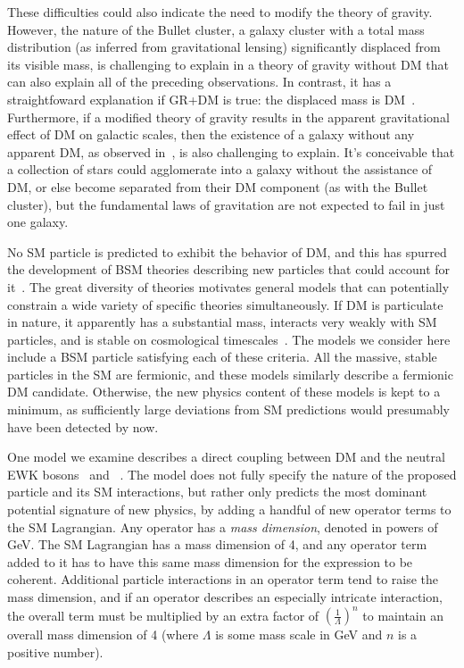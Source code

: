 These difficulties could also indicate the need to modify the theory of gravity.
However, the nature of the Bullet cluster, a galaxy cluster with a total mass distribution (as inferred from gravitational lensing) significantly displaced from its visible mass,
is challenging to explain in a theory of gravity without DM that can also explain all of the preceding observations.
In contrast, it has a straightfoward explanation if GR+DM is true: the displaced mass is DM~\cite{ref:508162}. Furthermore, if a modified theory of gravity
results in the apparent gravitational effect of DM on galactic scales, then the existence of a galaxy without any apparent DM, as observed in~\cite{ref:nature25767}, is
also challenging to explain. It's conceivable that a collection of stars could agglomerate into a galaxy without the assistance of DM, or else become separated from their
DM component (as with the Bullet cluster), but the fundamental laws of gravitation are not expected to fail in just one galaxy.

No SM particle is predicted to exhibit the behavior of DM, and this has spurred the development
of BSM theories describing new particles that could account for it~\cite{ref:s41550-017-0059, ref:j.physrep.2004.08.031, ref:annurev.nucl.54.070103.181244, ref:S1062798717000783}.
The great diversity of theories motivates general models that can potentially constrain a wide variety of specific theories simultaneously.
If DM is particulate in nature, it apparently has a substantial mass, interacts very weakly with SM particles, and is stable on cosmological timescales~\cite{}.
The models we consider here include a BSM particle satisfying each of these criteria.
All the massive, stable particles in the SM are fermionic, and these models similarly describe a fermionic DM candidate. Otherwise, the new physics
content of these models is kept to a minimum, as sufficiently large deviations from SM predictions would presumably have been detected by now.

One model we examine describes a direct coupling between DM and the neutral EWK bosons \PZ\ and \Pgamma~\cite{ref:PhysRevD.89.056011}. The model does not fully specify
the nature of the proposed particle and its SM interactions, but rather only predicts the most dominant potential signature of new physics,
by adding a handful of new operator terms to the SM Lagrangian. Any operator has a \textit{mass dimension}, denoted in powers of GeV. The SM Lagrangian has
a mass dimension of 4, and any operator term added to it has to have this same mass dimension for the expression to be coherent.
Additional particle interactions in an operator term tend to raise the mass dimension, and if an operator describes an especially intricate interaction,
the overall term must be multiplied by an extra factor of $(\frac{1}{\Lambda})^{n}$ to maintain an overall mass dimension of 4 (where $\Lambda$ is some mass
scale in GeV and $n$ is a positive number).

